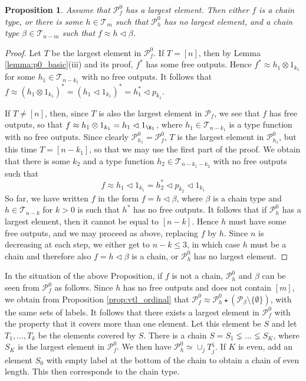 \documentclass[12pt]{article}
\newtheorem{prop}{Proposition}
\theoremstyle{definition}
\theoremstyle{remark}
\def\Te{\mathcal T}
\def\Pe{\mathcal P}
\def\vtl{\vartriangleleft}
\begin{document}
\begin{prop}\label{prop:pf0_largest} Assume that $\Pe_f^0$ has a largest element.  Then
either $f$ is a chain type, or there is some $h\in \Te_m$ such that $\Pe_h^0$ has  no largest element,
and a chain type $\beta\in \Te_{n-m}$ such that $f\approx h\vtl \beta$.

\end{prop}



\begin{proof} Let $T$ be the largest element in $\Pe_f^0$. If $T=[n]$, then by Lemma
\ref{lemma:p0_basic}(iii) and its proof, $f^*$ has some free outputs. Hence
$f^*\approx h_1\otimes 1_{k_1}$ for some $h_1\in \Te_{n-k_1}$ with no free outputs. It follows that
$f\approx (h_1\otimes 1_{k_1})^*=(h_1\vtl 1_{k_1})^*=h_1^*\vtl p_{k_1}$. 

If $T\ne [n]$, then, since $T$  
is also the largest element in $\Pe_f$, we see that $f$ has free outputs, so that
$f\approx h_1\otimes 1_{k_1}=h_1\vtl 1_{\k_1}$, where $h_1\in \Te_{n-k_1}$ is a type function with no
free outputs. Since clearly $\Pe_{h_1}^0=\Pe_f^0$,  $T$ is the largest
element in $\Pe^0_{h_1}$, but this time $T=[n-k_1]$, so that we may use the first part of the
proof. We obtain that there is some $k_2$ and a type function  $h_2\in\Te_{n-k_1-k_2}$
with no free outputs such that 
\[
f\approx h_1\vtl 1_{k_1}=h_2^*\vtl p_{k_2}\vtl 1_{k_1}
\]
So far, we have written $f$ in the form $f=h\vtl \beta$, where $\beta$ is a chain type and
$h\in \Te_{n-k}$ for $k>0$ is such that $h^*$ has no free outputs. It follows that if
$\Pe_h^0$ has a largest element, then it cannot be equal to $[n-k]$. Hence $h$ must have
some free outputs, and we may proceed as above, replacing $f$ by $h$. Since $n$ is decreasing at each step, we
 either get to $n-k \le 3$, in which case $h$ must be a chain and therefore also $f=h\vtl
 \beta$ is a chain, or $\Pe^0_h$ has no largest element.


\end{proof}

In the situation of the above Proposition, if $f$ is not a chain, $\Pe_h^0$ and  $\beta$ can be
seen from $\Pe_f^0$ as follows. 
Since $h$ has no free outputs and does not contain
$[m]$, we obtain from Proposition \ref{prop:vtl_ordinal} that $\Pe_f^0\approx \Pe_h^0\star
(\Pe_\beta\setminus\{\emptyset\})$, with the same sets of labels.
It follows that there exists a largest element in $\Pe_f^0$ with the property that
it covers more than one element. Let this element be $S$ and let $T_1,\dots, T_k$ be the
elements covered by $S$. There is a chain $S=S_1\lneq \dots \lneq S_K$, where $S_K$ is
the largest element in $\Pe_f^0$. We then have $\Pe_h^0\simeq \cup_j T_j^{\downarrow}$. 
If $K$ is even, add an element $S_0$ with empty
label at the bottom of the chain to obtain a chain of even length. This then corresponds
to the chain type.
\end{document}
